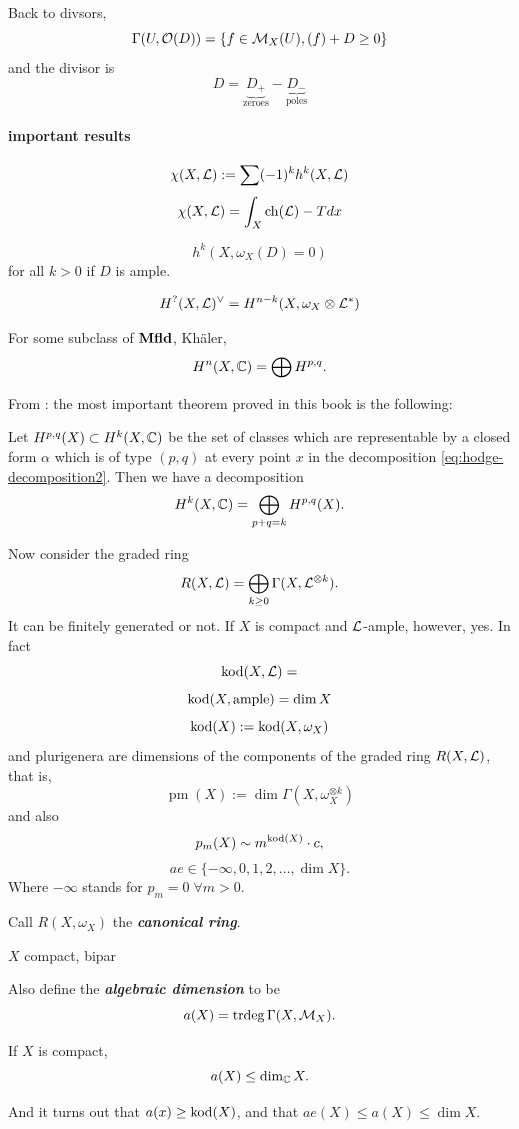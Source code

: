 Back to divsors,
\[\Gamma(U,\mathcal{O}(D))=\{f\in\mathcal{M}_X(U),(f)+D\geq0\}\]
and the divisor is
\[D=\underbrace{D_+}_{\text{zeroes}}-\underbrace{D_-}_{\text{poles}}\]
\paragraph{important results}
\begin{thm}
	\[\chi(X,\mathcal{L}):=\sum(-1)^kh^k(X,\mathcal{L})\]
	\[\chi(X,\mathcal{L})=\int_X\operatorname{ch}(\mathcal{L})-Tdx\]
\end{thm}
\begin{thm}
	\[h^k(X,\omega_X(D)=0)\]
	for all $k>0$ if $D$ is ample.
\end{thm}
\begin{thm}
	\[H^?(X,\mathcal{L})^\vee=H^{n-k}(X,\omega_X\otimes\mathcal{L}^*)\]
\end{thm}
\begin{thm}[Hodge]
	For some subclass of $\mathbf{Mfld}$, Khäler,
	\[H^n(X,\mathbb{C})=\bigoplus H^{p,q}.\]
\end{thm}
From \cite{voisin-intro}: the most important theorem proved in this book is the following:
\begin{thm}
	Let $H^{p,q}(X) \subset H^k(X,\mathbb{C})$ be the set of classes which are representable by a closed form $\alpha$ which is of type $(p,q)$ at every point $x$ in the decomposition \cref{eq:hodge-decomposition2}. Then we have a decomposition
	\[H^k(X,\mathbb{C})=\bigoplus_{p+q=k}H^{p,q}(X).\]
\end{thm}
Now consider the graded ring
\[R(X,\mathcal{L})=\bigoplus_{k\geq0}\Gamma(X,\mathcal{L}^{\otimes k}).\]
It can be finitely generated or not. If $X$ is compact and $\mathcal{L}$-ample, however, yes. In fact
\[\operatorname{kod}(X,\mathcal{L})=\]
\[\operatorname{kod}(X,\text{ample})=\dim X\]
\[\operatorname{kod}(X):=\operatorname{kod}(X,\omega_X)\]
and plurigenera are dimensions of the components of the graded ring $R(X,\mathcal{L})$, that is,
\[\operatorname{pm}(X):=\dim\Gamma(X,\omega_X^{\otimes k})\]
and also
\[p_m(X)\sim m^{\operatorname{kod}(X)}\cdot c,\]
\[ae\in\{-\infty,0,1,2,\ldots,\dim X\}.\]
Where $-\infty$ stands for $p_m=0\;\forall m>0$.

Call $R(X,\omega_X)$ the \textbf{\textit{canonical ring}}.
\begin{thm}[Caseini, et al. 2006]
	$X$ compact, bipar
\end{thm}
Also define the \textbf{\textit{algebraic dimension}} to be
\[a(X)=\operatorname{trdeg}\Gamma(X,\mathcal{M}_X).\]
\begin{thm}[Siegel]
	If $X$ is compact,
	\[a(X)\leq\dim_{\mathbb{C}} X.\]
\end{thm}
And it turns out that $a(x)\geq\operatorname{kod}(X)$, and that $ae(X)\leq a(X)\leq \dim X$.
